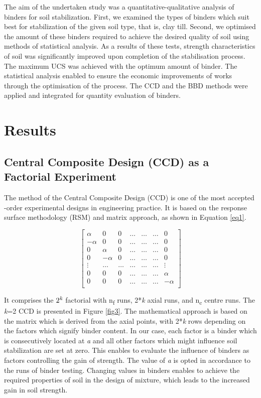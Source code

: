 \documentclass[eprint,
]{actapoly}
\begin{document}
The aim of the undertaken study was a quantitative-qualitative analysis of binders for soil stabilization. First, we examined the types of binders which suit best for stabilization of the given soil type, that is, clay till. Second, we optimised the amount of these binders required to achieve the desired quality of soil using methods of statistical analysis. As a results of these tests, strength characteristics of soil was significantly improved upon completion of the stabilisation process. The maximum UCS was achieved with the optimum amount of binder. The statistical analysis enabled to ensure the economic improvements of works through the optimisation of the process. The CCD and the BBD methods were applied and integrated for quantity evaluation of binders.

\section{Results}
\subsection{Central Composite Design (CCD) as a Factorial Experiment}
The method of the Central Composite Design (CCD) is one of the most accepted -order experimental designs in engineering practice. It is based on the response surface methodology (RSM) \cite{Montgomery2019} and matrix approach, as shown in Equation \ref{eq1}. 

\begin{equation}\label{eq1}
\begin{bmatrix}
\alpha & 0 & 0 & \ldots & \ldots & \ldots & 0 \\
-\alpha & 0 & 0 & \ldots & \ldots & \ldots & 0 \\
0 & \alpha & 0 & \ldots & \ldots & \ldots & 0 \\
0 & -\alpha & 0 & \ldots & \ldots & \ldots & 0 \\
\vdots & \ldots & \ldots & \ldots & \ldots & \ldots & \vdots \\
0 & 0 & 0 & \ldots & \ldots & \ldots & \alpha \\
0 & 0 & 0 & \ldots & \ldots & \ldots & -\alpha \\
\end{bmatrix}
\end{equation}

It comprises the $2^\emph{k}$ factorial with n\textsubscript{f} runs, 2*\emph{k} axial runs, and n\textsubscript{c} centre runs. The \emph{k}=2 CCD is presented in Figure \ref{fig3}. The mathematical approach is based on the matrix which is derived from the axial points, with 2*\emph{k} rows depending on the factors which signify binder content. In our case, each factor is a binder which is consecutively located at \emph{a} and all other factors which might influence soil stabilization are set at zero. This enables to evaluate the influence of binders as factors controlling the gain of strength. The value of \emph{a} is opted in accordance to the runs of binder testing. Changing values in binders enables to achieve the required properties of soil in the design of mixture, which leads to the increased gain in soil strength.
\end{document}
